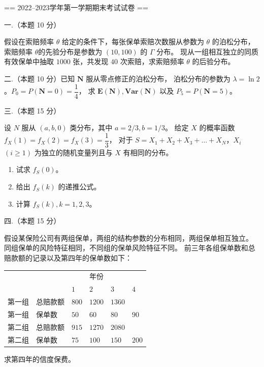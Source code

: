 
== 2022--2023学年第一学期期末考试试卷 ==

一.（本题 10 分）

假设在索赔频率 $\theta$ 给定的条件下，每张保单索赔次数服从参数为 $\theta$ 的泊松分布，
索赔频率 $\theta$的先验分布是参数为 $(10, 100)$ 的 $\Gamma$ 分布。
现从一组相互独立的同质有效保单中抽取 $1000$ 张，共发现 $40$ 次索赔，求索赔频率 $\theta$ 的后验分布。

二.（本题 10 分）已知 $\mathbf{N}$ 服从零点修正的泊松分布，
泊松分布的参数为 $\lambda=\ln 2$。$P_{0}=P(\mathbf{N}=0)=\dfrac{1}{4}$，
求 $\mathbf{E}(\mathbf{N}), \mathbf{Var}(\mathbf{N})$ 以及 $P_{5}=P(\mathbf{N}=5)$。

三.（本题 15 分）

设 $N$ 服从 $(a, b, 0)$ 类分布，其中 $a=2 / 3, b=1 / 3$。
给定 $X$ 的概率函数 $f_{X}(1)=f_{X}(2)=f_{X}(3)=\dfrac{1}{3}$，
对于 $S=X_{1}+X_{2}+X_{3}+\ldots+X_{N}$，$X_{i}$ $(i \geq 1)$ 为独立的随机变量列且与 $X$ 有相同的分布。
\begin{enumerate}[label=(\arabic*)]
\item 试求 $f_{S}(0)$。
\item 给出 $f_{S}(k)$ 的递推公式。
\item 计算 $f_{S}(k), k=1,2,3$。
\end{enumerate}

四.（本题 15 分）

假设某保险公司有两组保单，两组的结构参数的分布相同，两组保单相互独立。
同组保单的风险特征相同，不同组的保单风险特征不同。
前三年各组保单数和总赔款额的记录以及第四年的保单数如下：
\begin{center}
\begin{tabular}{|l|l|l|l|l|l|}
 & & & 年份 & & \\
 & & $1$ & $2$ & $3$ & $4$ \\
第一组 & 总赔款额 & $800$ & $1200$ & $1360$ & \\
第一组 & 保单数 & $50$ & $60$ & $80$ & $90$ \\
第二组 & 总赔款额 & $915$ & $1270$ & $2080$ & \\
第二组 & 保单数 & $75$ & $100$ & $150$ & $200$ 
\end{tabular}
\end{center}
求第四年的信度保费。

